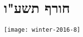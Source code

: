 \begin{comment}
\textbf{סעיף ב}

השטח המקסימלי של 
$\triangle APL$
הוא שטח הגזרה פחות השטח המינימלי של השטח האפור:
\erh{12pt}
\begin{equationarray*}{rcl}
S_{\triangle APL}&=&\frac{\pi R^2}{6} - (24\pi - 36)\\
&=&24\pi - (24\pi-36) = 36\,.
\end{equationarray*}


\np



\section{קיץ תשע"ו מועד ב}

\begin{center}
\selectlanguage{english}
\texttt{[image: summer-2016b-8]}

\end{center}

\vspace{-2ex}

\textbf{סעיף א}

\np



\section{קיץ תשע"ו מועד א}

\begin{center}
\selectlanguage{english}
\texttt{[image: summer-2016a-8a]}
\texttt{[image: summer-2016a-8b]}

\end{center}

\vspace{-2ex}

\textbf{סעיף א}

\np

\end{comment}


\section{חורף תשע"ו}

\begin{center}
\texttt{[image: winter-2016-8]}

\end{center}

